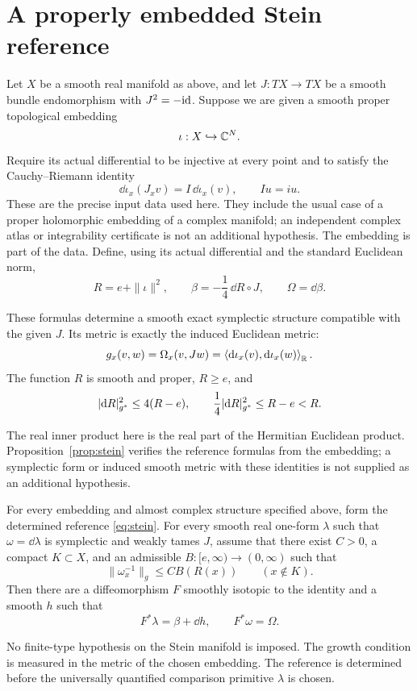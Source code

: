 \clearpage
\section{A properly embedded Stein reference}
Let $X$ be a smooth real manifold as above, and let $J:TX\to TX$
be a smooth bundle endomorphism with $J^2=-\mathrm{id}$. Suppose we are given
a smooth proper topological embedding
\[
 \iota:X\hookrightarrow\mathbb C^N.
\]
Require its actual differential to be injective at every point and
to satisfy the Cauchy--Riemann identity
\[
 \dd\iota_x(J_xv)=I\,\dd\iota_x(v),\qquad Iu=iu.
\]
These are the precise input data used here. They include the usual
case of a proper holomorphic embedding of a complex manifold; an
independent complex atlas or integrability certificate is not an
additional hypothesis. The embedding is part of the data.
Define, using its actual
differential and the standard Euclidean norm,
\begin{equation}\label{eq:stein}
 R=e+\|\iota\|^2,\qquad
 \beta=-\frac14\,\dd R\circ J,\qquad \Omega=\dd\beta .
\end{equation}

\begin{proposition}\label{prop:stein}
These formulas determine a smooth exact symplectic structure
compatible with the given $J$. Its metric is exactly the induced
Euclidean metric:
\[
 g_x(v,w)=\Omega_x(v,Jw)
   =\left\langle\mathrm d\iota_x(v),\mathrm d\iota_x(w)\right\rangle_{\mathbb R}.
\]
The function $R$ is smooth and proper, $R\ge e$, and
\[
 |\mathrm d R|_{g^*}^2\le4(R-e),\qquad
 \frac14|\mathrm d R|_{g^*}^2\le R-e<R.
\]
\end{proposition}
The real inner product here is the real part of the Hermitian
Euclidean product. Proposition~\ref{prop:stein} verifies the
reference formulas from the embedding; a symplectic form or induced
smooth metric with these identities is not supplied as an additional
hypothesis.

\begin{corollary}\label{cor:stein}
For every embedding and almost complex structure specified above,
form the determined
reference \eqref{eq:stein}. For every smooth real one-form $\lambda$
such that $\omega=\dd\lambda$ is symplectic and weakly tames $J$,
assume that there exist $C>0$, a compact $K\subset X$, and an
admissible $B:[e,\infty)\to(0,\infty)$ such that
\[
 \|\omega_x^{-1}\|_g\le C B(R(x))\qquad(x\notin K).
\]
Then there are a diffeomorphism $F$ smoothly isotopic to the identity
and a smooth $h$ such that
\[
 F^*\lambda=\beta+\dd h,\qquad F^*\omega=\Omega.
\]
\end{corollary}
No finite-type hypothesis on the Stein manifold is imposed.
The growth condition is measured in the metric of the chosen
embedding. The reference is determined before the universally
quantified comparison primitive $\lambda$ is chosen.

